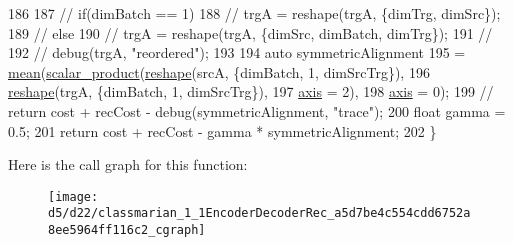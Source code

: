 \begin{DoxyCode}
186 
187     \textcolor{comment}{// if(dimBatch == 1)}
188     \textcolor{comment}{//  trgA = reshape(trgA, \{dimTrg, dimSrc\});}
189     \textcolor{comment}{// else}
190     \textcolor{comment}{//  trgA = reshape(trgA, \{dimSrc, dimBatch, dimTrg\});}
191     \textcolor{comment}{//}
192     \textcolor{comment}{// debug(trgA, "reordered");}
193 
194     \textcolor{keyword}{auto} symmetricAlignment
195         = \hyperlink{namespacemarian_a15ec9743709e47180378db974ddbf116}{mean}(\hyperlink{namespacemarian_a7bed97354565d7b751bed999c6c203e3}{scalar\_product}(\hyperlink{namespacemarian_acd984f43188d0ae23c2a6ef13ae5293f}{reshape}(srcA, \{dimBatch, 1, dimSrcTrg\}),
196                               \hyperlink{namespacemarian_acd984f43188d0ae23c2a6ef13ae5293f}{reshape}(trgA, \{dimBatch, 1, dimSrcTrg\}),
197                               \hyperlink{namespacemarian_1_1keywords_ace9158eabbddaca833133f12da98b9d6}{axis} = 2),
198                \hyperlink{namespacemarian_1_1keywords_ace9158eabbddaca833133f12da98b9d6}{axis} = 0);
199     \textcolor{comment}{//      return cost + recCost - debug(symmetricAlignment, "trace");}
200     \textcolor{keywordtype}{float} gamma = 0.5;
201     \textcolor{keywordflow}{return} cost + recCost - gamma * symmetricAlignment;
202   \}
\end{DoxyCode}


Here is the call graph for this function\+:
\nopagebreak
\begin{figure}[H]
\begin{center}
\leavevmode
\texttt{[image: d5/d22/classmarian\_1\_1EncoderDecoderRec\_a5d7be4c554cdd6752a8ee5964ff116c2\_cgraph]}
\end{center}
\end{figure}


